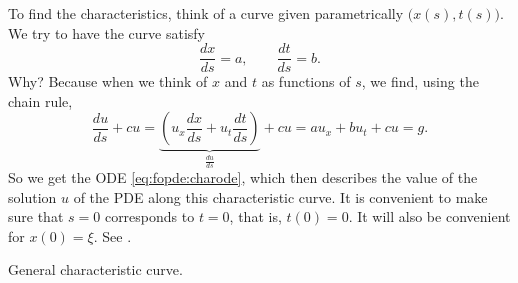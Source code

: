 To find the characteristics, think of a curve given parametrically
$\bigl(x(s),t(s)\bigr)$.  We try to have the curve satisfy 
\begin{equation*}
\frac{dx}{ds} = a, \qquad \frac{dt}{ds} = b .
\end{equation*}
Why?
Because when we think of $x$ and $t$ as functions of $s$, we find, using the
chain rule,
\begin{equation*}
\frac{du}{ds} + c u = 
\underbrace{\left( u_x \frac{dx}{ds} + u_t
\frac{dt}{ds}\right)}_{\frac{du}{ds}} + c u =
a u_x + b u_t + c u = g .
\end{equation*}
So we get the ODE \eqref{eq:fopde:charode}, which
then describes the value of the solution $u$ of
the PDE along
this characteristic curve.
It is convenient to make sure that $s=0$
corresponds to $t=0$, that is, $t(0) = 0$.  It will also be convenient for
$x(0) = \xi$.
See .

\begin{myfig}
\capstart
{}
\caption{General characteristic curve.\label{fopde:charcurvecurvy}}
\end{myfig}


